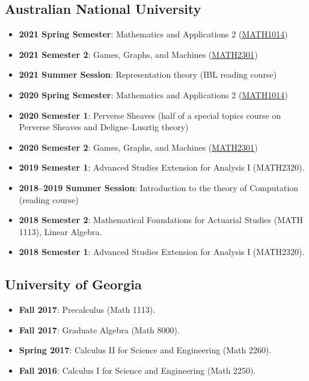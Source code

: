 \documentclass[a4paper]{moderncv}
\begin{document}
\subsection{Australian National University}
\label{sec:orgfc1b2f1}
\begin{itemize}
\item \textbf{2021 Spring Semester}: Mathematics and Applications 2 (\href{https://programsandcourses.anu.edu.au/course/MATH1014}{MATH1014})
\item \textbf{2021 Semester 2}: Games, Graphs, and Machines (\href{https://asilata.github.io/ggm/}{MATH2301})
\item \textbf{2021 Summer Session}: Representation theory (IBL reading course)
\item \textbf{2020 Spring Semester}: Mathematics and Applications 2 (\href{https://programsandcourses.anu.edu.au/course/MATH1014}{MATH1014})
\item \textbf{2020 Semester 1}: Perverse Sheaves (half of a special topics course on Perverse Sheaves and Deligne--Lusztig theory)
\item \textbf{2020 Semester 2}: Games, Graphs, and Machines (\href{https://asilata.github.io/ggm/}{MATH2301})
\item \textbf{2019 Semester 1}: Advanced Studies Extension for Analysis I (MATH2320).
\item \textbf{2018–2019 Summer Session}: Introduction to the theory of Computation (reading course)
\item \textbf{2018 Semester 2}: Mathematical Foundations for Actuarial Studies (MATH 1113), Linear Algebra.
\item \textbf{2018 Semester 1}: Advanced Studies Extension for Analysis I (MATH2320).
\end{itemize}


\subsection{University of Georgia}
\label{sec:orgbca5936}
\begin{itemize}
\item \textbf{Fall 2017}: Precalculus (Math 1113).
\item \textbf{Fall 2017}: Graduate Algebra (Math 8000).
\item \textbf{Spring 2017}: Calculus II for Science and Engineering (Math 2260).
\item \textbf{Fall 2016}: Calculus I for Science and Engineering (Math 2250).
\end{itemize}
\end{document}
